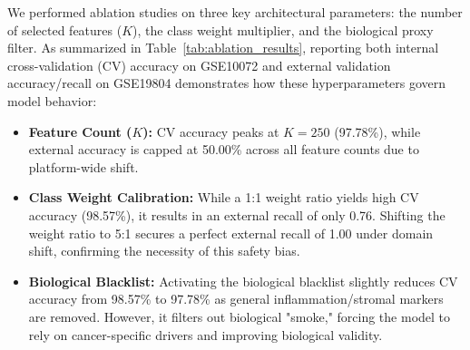 \documentclass[journal,10pt]{IEEEtran}
\begin{document}
We performed ablation studies on three key architectural parameters: the number of selected features ($K$), the class weight multiplier, and the biological proxy filter. As summarized in Table~\ref{tab:ablation_results}, reporting both internal cross-validation (CV) accuracy on GSE10072 and external validation accuracy/recall on GSE19804 demonstrates how these hyperparameters govern model behavior:
\begin{itemize}
    \item \textbf{Feature Count ($K$):} CV accuracy peaks at $K=250$ (97.78\%), while external accuracy is capped at 50.00\% across all feature counts due to platform-wide shift.
    \item \textbf{Class Weight Calibration:} While a 1:1 weight ratio yields high CV accuracy (98.57\%), it results in an external recall of only 0.76. Shifting the weight ratio to 5:1 secures a perfect external recall of 1.00 under domain shift, confirming the necessity of this safety bias.
    \item \textbf{Biological Blacklist:} Activating the biological blacklist slightly reduces CV accuracy from 98.57\% to 97.78\% as general inflammation/stromal markers are removed. However, it filters out biological "smoke," forcing the model to rely on cancer-specific drivers and improving biological validity.
\end{itemize}
\end{document}
